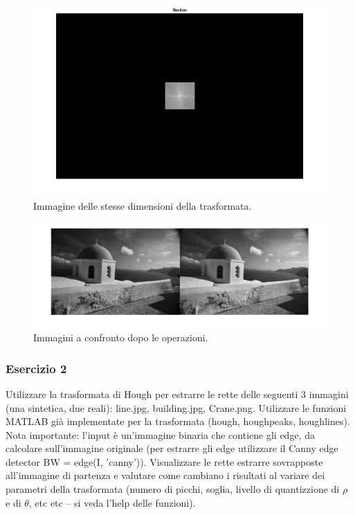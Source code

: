 \documentclass[a4paper]{article}
\begin{document}
	\begin{figure}[!htp]
		\centering
		\includegraphics[width=\textwidth]{img/lab/operato-locali-17.jpg}
		\caption{Immagine delle stesse dimensioni della trasformata.}
	\end{figure}
	\begin{figure}[!htp]
		\centering
		\includegraphics[width=\textwidth]{img/lab/operato-locali-18.jpg}
		\caption{Immagini a confronto dopo le operazioni.}
	\end{figure}\newpage
	
	\subsubsection{Esercizio 2}
	
	Utilizzare la trasformata di Hough per estrarre le rette delle seguenti 3 immagini (una sintetica, due reali): \textsf{line.jpg, building.jpg, Crane.png}. Utilizzare le funzioni MATLAB già implementate per la trasformata (\textsf{hough, houghpeaks, houghlines}). Nota importante: l'input è un'immagine binaria che contiene gli edge, da calcolare sull'immagine originale (per estrarre gli edge utilizzare il Canny edge detector \textsf{BW = edge(I, 'canny')}). Visualizzare le rette estrarre sovrapposte all'immagine di partenza e valutare come cambiano i risultati al variare dei parametri della trasformata (numero di picchi, soglia, livello di quantizzione di $\rho$ e di $\theta$, etc etc -- si veda l'help delle funzioni).\newline
	
\end{document}
